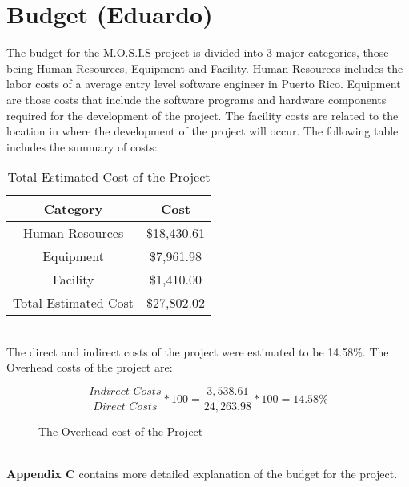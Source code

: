 
 \section{Budget (Eduardo)}
 The budget for the M.O.S.I.S project is divided into 3 major categories, those being Human Resources, Equipment and Facility. Human Resources includes the labor costs of a average entry level software engineer in Puerto Rico\cite{SoftwareEngineerSalary}. Equipment are those costs that include the software programs and hardware components required for the development of the project. The facility costs are related to the location in where the development of the project will occur. The following table includes the summary of costs:
 \begin{table}[h]
    \centering
    \begin{tabular}{||c | c||} 
     \hline
     \rowcolor{cyan}
     Category & Cost \\ [0.5ex] 
     \hline
     Human Resources & \$18,430.61\\ 
     \hline
     Equipment & \$7,961.98\\
     \hline
     Facility & \$1,410.00\\
     \hline
     \rowcolor{teal}
     Total Estimated Cost & \$27,802.02\\
     \hline
    \end{tabular}
    \caption {Total Estimated Cost of the Project}
    \label {table:1}
\end{table}
\\ The direct and indirect costs of the project were estimated to be 14.58\%. The Overhead costs of the project are:
\begin{figure}[h]
   $$\frac{\textit{Indirect Costs}}{\textit{Direct Costs}} * 100 = \frac{3,538.61}{24,263.98} * 100 = 14.58\%$$
\caption{The Overhead cost of the Project}
\end{figure}
\\\textbf{Appendix C} contains more detailed explanation of the budget for the project.